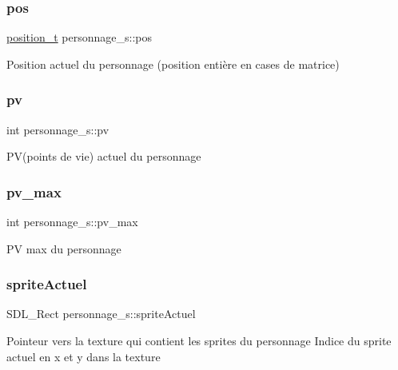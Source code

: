\subsubsection{\texorpdfstring{pos}{pos}}
{\footnotesize\ttfamily \hyperlink{structposition__s}{position\+\_\+t} personnage\+\_\+s\+::pos}

Position actuel du personnage (position entière en cases de matrice) \mbox{\label{structpersonnage__s_ab3090d9110756af454516f939e9f8a86}} 
\subsubsection{\texorpdfstring{pv}{pv}}
{\footnotesize\ttfamily int personnage\+\_\+s\+::pv}

P\+V(points de vie) actuel du personnage \mbox{\label{structpersonnage__s_a0e58c8761de9044ce770f21aa9ada41a}} 
\subsubsection{\texorpdfstring{pv\+\_\+max}{pv\_max}}
{\footnotesize\ttfamily int personnage\+\_\+s\+::pv\+\_\+max}

PV max du personnage \mbox{\label{structpersonnage__s_afa75822afebdaf61725b7f87c86d5922}} 
\subsubsection{\texorpdfstring{sprite\+Actuel}{spriteActuel}}
{\footnotesize\ttfamily S\+D\+L\+\_\+\+Rect personnage\+\_\+s\+::sprite\+Actuel}

Pointeur vers la texture qui contient les sprites du personnage Indice du sprite actuel en x et y dans la texture \mbox{\label{structpersonnage__s_a0022973bab638a02774a19710cedcd17}} 
